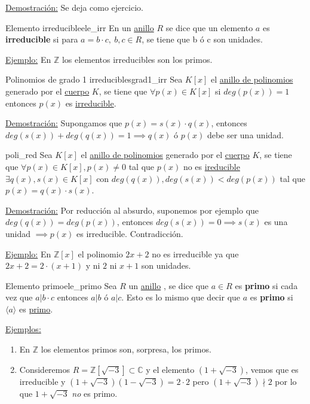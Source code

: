 \documentclass[10pt, a4paper]{article}
\newcommand{\Z}{\mathbb{Z}}
\newcommand{\C}{\mathbb{C}}
\newcommand{\ej}{\underline{Ejemplo:} }
\newcommand{\ejs}{\underline{Ejemplos:} }
\newcommand{\demo}{\underline{Demostración:} }
\newcommand{\anillo}[1][]{\hyperref[def:anillo]{anillo}#1 }
\newcommand{\cuerpo}[1][]{\hyperref[def:cuerpo]{cuerpo}#1 }
\newenvironment{enumeratea}{\begin{enumerate}[label=\arabic*)]}
{\end{enumerate}}
\begin{document}
\demo Se deja como ejercicio.

\begin{definition}{Elemento irreducible}{ele_irr}
En un \anillo $R$ se dice que un elemento $a$ es \textbf{irreducible} si para $a = b \cdot c,\ b, c \in R$, se tiene que b ó c son unidades.
\end{definition}

\ej En $\Z$ los elementos irreducibles son los primos.

\begin{proposition}{Polinomios de grado 1 irreducibles}{grad1_irr}
Sea $K[x]$ el \hyperref[def:anillopoli]{anillo de polinomios} generado por el \cuerpo $K$, se tiene que $\forall p(x) \in K[x]$ si $deg(p(x)) = 1$ entonces $p(x)$ es \hyperref[def:ele_irr]{irreducible}.
\end{proposition}

\demo Supongamos que $p(x) = s(x) \cdot q(x)$, entonces $deg(s(x)) + deg(q(x)) = 1 \implies q(x) \text{ ó } p(x)$ debe ser una unidad.

\begin{proposition}{}{poli_red}
Sea $K[x]$ el \hyperref[def:anillopoli]{anillo de polinomios} generado por el \cuerpo $K$, se tiene que $\forall p(x) \in K[x], p(x) \neq 0$ tal que $p(x)$ no es \hyperref[def:ele_irr]{ireducible} $\exists q(x), s(x) \in K[x]$ con $deg(q(x)), deg(s(x)) < deg(p(x))$ tal que $p(x) = q(x) \cdot s(x)$.
\end{proposition}

\demo Por reducción al absurdo, suponemos por ejemplo que $deg(q(x)) = deg(p(x))$, entonces $deg(s(x)) = 0 \implies s(x)$ es una unidad $\implies p(x)$ es irreducible. Contradicción.

\vspace{3mm}

\ej En $\Z[x]$ el polinomio $2x + 2$ no es irreducible ya que $2x + 2 = 2 \cdot (x + 1)$ y ni $2$ ni $x + 1$ son unidades.

\begin{definition}{Elemento primo}{ele_primo}
Sea $R$ un \anillo, se dice que $a \in R$ es \textbf{primo} si cada vez que $a | b \cdot c$ entonces $a | b$ ó $a | c$. Esto es lo mismo que decir que $a$ es \textbf{primo} si $\langle a \rangle$ es \hyperref[def:ideal_primo]{primo}.
\end{definition}

\ejs

\begin{enumeratea}
	\item En $\Z$ los elementos primos son, sorpresa, los primos.
	\item Consideremos $R = \Z[\sqrt{-3}] \subset \C$ y el elemento $(1 + \sqrt{-3})$, vemos que es irreducible y $(1 + \sqrt{-3})(1 - \sqrt{-3}) = 2 \cdot 2$ pero $(1 + \sqrt{-3}) \nmid 2$ por lo que $1 + \sqrt{-3}$ \emph{no} es primo.
\end{enumeratea}
\end{document}
